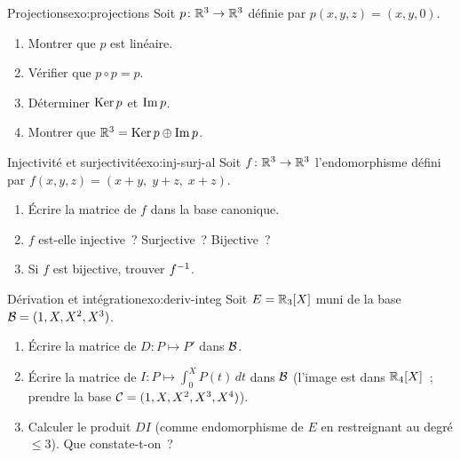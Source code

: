 \begin{exercise}{\basic{} Projections}{exo:projections}
  Soit $p\colon{\mathbb{R}}^3\to{\mathbb{R}}^3$ définie par $p(x,y,z)=(x,y,0)$.
  \begin{enumerate}[label=(\alph*)]
    \item Montrer que $p$ est linéaire.
    \item Vérifier que $p\circ p=p$.
    \item Déterminer $\operatorname{Ker} p$ et $\operatorname{Im} p$.
    \item Montrer que ${\mathbb{R}}^3=\operatorname{Ker} p\oplus\operatorname{Im} p$.
  \end{enumerate}
\end{exercise}

\begin{exercise}{\intermediate{} Injectivité et surjectivité}{exo:inj-surj-al}
  Soit $f\colon{\mathbb{R}}^3\to{\mathbb{R}}^3$ l'endomorphisme défini par
  $f(x,y,z)=(x+y,\;y+z,\;x+z)$.
  \begin{enumerate}[label=(\alph*)]
    \item Écrire la matrice de $f$ dans la base canonique.
    \item $f$ est-elle injective~? Surjective~? Bijective~?
    \item Si $f$ est bijective, trouver ${f}^{-1}$.
  \end{enumerate}
\end{exercise}

\begin{exercise}{\intermediate{} Dérivation et intégration}{exo:deriv-integ}
  Soit $E={\mathbb{R}}_3[X]$ muni de la base ${\mathcal{B}}=(1,X,X^2,X^3)$.
  \begin{enumerate}[label=(\alph*)]
    \item Écrire la matrice de $D\colon P\mapsto P'$ dans ${\mathcal{B}}$.
    \item Écrire la matrice de $I\colon P\mapsto\int_0^X P(t)\,dt$ dans
      ${\mathcal{B}}$ (l'image est dans ${\mathbb{R}}_4[X]$~; prendre la base
      ${\mathcal{C}}=(1,X,X^2,X^3,X^4)$).
    \item Calculer le produit $DI$ (comme endomorphisme de $E$ en
      restreignant au degré $\leq 3$). Que constate-t-on~?
  \end{enumerate}
\end{exercise}

